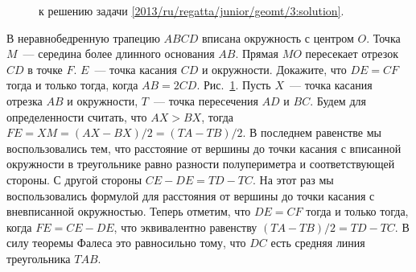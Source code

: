 \ifsolution
\begin{figure}\centering
    \caption{к решению задачи \ref{2013/ru/regatta/junior/geomt/3:solution}.}
    \label{2013/ru/regatta/junior/geomt/3:solution:fig}
\end{figure}%
\fi %

\problem
В неравнобедренную трапецию $ABCD$ вписана окружность с центром $O$.
Точка $M$~--- середина более длинного основания $AB$.
Прямая $MO$ пересекает отрезок $CD$ в точке $F$.
$E$~--- точка касания $CD$ и окружности.
Докажите, что $DE = CF$ тогда и только тогда, когда $AB = 2 CD$.
\solution
\label{2013/ru/regatta/junior/geomt/3:solution}%
Рис.~\ref{2013/ru/regatta/junior/geomt/3:solution:fig}.
Пусть $X$~--- точка касания отрезка $AB$ и окружности, $T$~--- точка
пересечения $AD$ и $BC$.
Будем для определенности считать, что $AX > BX$, тогда
$FE = XM = (AX - BX) / 2 = (TA - TB) / 2$.
В последнем равенстве мы воспользовались тем, что расстояние от вершины до
точки касания с вписанной окружности в треугольнике равно разности
полупериметра и соответствующей стороны.
С другой стороны $CE - DE = TD - TC$.
На этот раз мы воспользовались формулой для расстояния от вершины до точки
касания с вневписанной окружностью.
Теперь отметим, что $DE = CF$ тогда и только тогда, когда $FE = CE - DE$, что
эквивалентно равенству $(TA - TB) / 2 = TD - TC$.
В силу теоремы Фалеса это равносильно тому, что $DC$ есть средняя линия
треугольника $TAB$.
\endproblem
